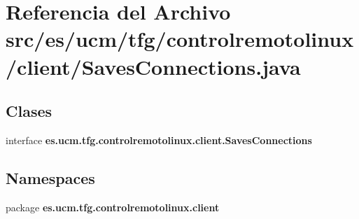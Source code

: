 \section{Referencia del Archivo src/es/ucm/tfg/controlremotolinux/client/\-Saves\-Connections.java}
\label{SavesConnections_8java}
\subsection*{Clases}
\begin{DoxyCompactItemize}
\item 
interface {\bf es.\-ucm.\-tfg.\-controlremotolinux.\-client.\-Saves\-Connections}
\end{DoxyCompactItemize}
\subsection*{Namespaces}
\begin{DoxyCompactItemize}
\item 
package {\bf es.\-ucm.\-tfg.\-controlremotolinux.\-client}
\end{DoxyCompactItemize}
